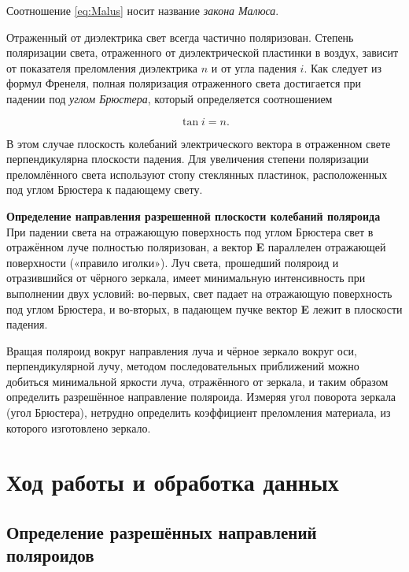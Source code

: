 	Соотношение \eqref{eq:Malus} носит название \textit{закона Малюса}.
	
	Отраженный от диэлектрика свет всегда частично поляризован. Степень поляризации света, отраженного от диэлектрической пластинки в воздух, зависит от показателя преломления диэлектрика $n$ и от угла падения $i$. Как следует из формул Френеля, полная поляризация отраженного света достигается
	при падении под \textit{углом Брюстера}, который определяется соотношением
	
	\begin{equation}
	\tan i = n.   
	\end{equation}
	
	В этом случае плоскость колебаний электрического вектора в отраженном свете перпендикулярна плоскости падения. Для увеличения степени поляризации преломлённого света используют стопу стеклянных пластинок, расположенных под углом Брюстера к падающему свету.
	
	\textbf{Определение направления разрешенной плоскости колебаний поляроида} 
	При падении света на отражающую поверхность под углом Брюстера свет в отражённом луче полностью поляризован, а вектор \textbf{E} параллелен
	отражающей поверхности («правило иголки»). Луч света, прошедший поляроид и отразившийся от чёрного зеркала, имеет минимальную интенсивность при выполнении двух условий: во-первых, свет падает на отражающую поверхность под углом Брюстера, и во-вторых, в падающем пучке вектор
	\textbf{E} лежит в плоскости падения.
	
	Вращая поляроид вокруг направления луча и чёрное зеркало вокруг оси, перпендикулярной лучу, методом последовательных приближений
	можно добиться минимальной яркости луча, отражённого от зеркала, и таким образом определить разрешённое направление поляроида. Измеряя угол поворота зеркала (угол Брюстера), нетрудно определить коэффициент преломления материала, из которого изготовлено зеркало.
	
	\section*{Ход работы и обработка данных}
	
	\subsection*{Определение разрешённых направлений поляроидов}
	
